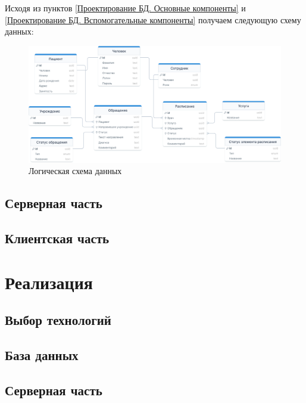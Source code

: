\documentclass[a4paper,article]{article}
\begin{document}
    Исходя из пунктов \ref{Проектирование БД. Основные компоненты} и \ref{Проектирование БД. Вспомогательные компоненты} получаем следующую схему данных:

    \begin{figure}[h]

        \centering

        \includegraphics[width=0.9\linewidth]{Логическая схема данных.png}

        \caption{\centering Логическая схема данных}

        \label{fig:Логическая схема данных}

    \end{figure}

    \subsection{Серверная часть}

    \subsection{Клиентская часть}

    \newpage

    \section{Реализация}

    \subsection{Выбор технологий}

    \subsection{База данных}

    \subsection{Серверная часть}
\end{document}
